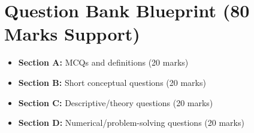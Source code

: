 \documentclass[11pt,a4paper]{article}
\begin{document}
\section{Question Bank Blueprint (80 Marks Support)}

\begin{conceptbox}
\begin{itemize}[leftmargin=*]
  \item \textbf{Section A:} MCQs and definitions (20 marks)
  \item \textbf{Section B:} Short conceptual questions (20 marks)
  \item \textbf{Section C:} Descriptive/theory questions (20 marks)
  \item \textbf{Section D:} Numerical/problem-solving questions (20 marks)
\end{itemize}
\end{conceptbox}
\end{document}
